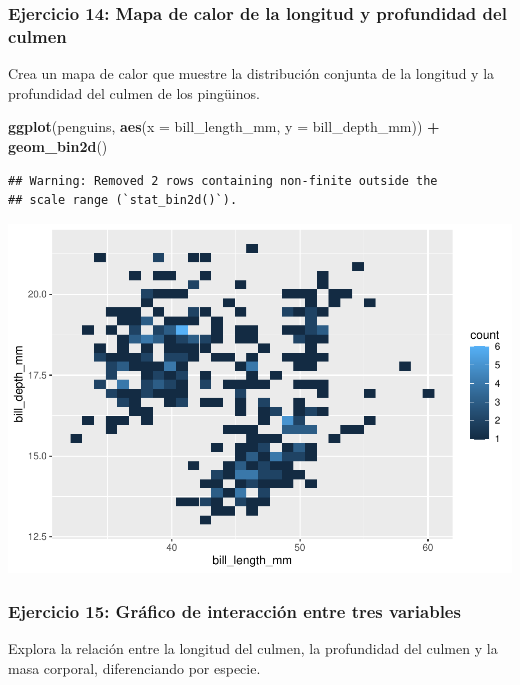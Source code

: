 \documentclass[
]{book}
\newenvironment{Shaded}{\begin{snugshade}}{\end{snugshade}}
\newcommand{\AttributeTok}[1]{\textcolor[rgb]{0.13,0.29,0.53}{#1}}
\newcommand{\FunctionTok}[1]{\textcolor[rgb]{0.13,0.29,0.53}{\textbf{#1}}}
\newcommand{\NormalTok}[1]{#1}
\newcommand{\SpecialCharTok}[1]{\textcolor[rgb]{0.81,0.36,0.00}{\textbf{#1}}}
\begin{document}
\subsubsection{Ejercicio 14: Mapa de calor de la longitud y profundidad del culmen}\label{ejercicio-14-mapa-de-calor-de-la-longitud-y-profundidad-del-culmen}

Crea un mapa de calor que muestre la distribución conjunta de la longitud y la profundidad del culmen de los pingüinos.

\begin{Shaded}
\begin{Highlighting}[]
\FunctionTok{ggplot}\NormalTok{(penguins, }\FunctionTok{aes}\NormalTok{(}\AttributeTok{x =}\NormalTok{ bill\_length\_mm, }\AttributeTok{y =}\NormalTok{ bill\_depth\_mm)) }\SpecialCharTok{+}
  \FunctionTok{geom\_bin2d}\NormalTok{()}
\end{Highlighting}
\end{Shaded}

\begin{verbatim}
## Warning: Removed 2 rows containing non-finite outside the
## scale range (`stat_bin2d()`).
\end{verbatim}

\includegraphics{bookdown-demo_files/figure-latex/unnamed-chunk-196-1.pdf}

\subsubsection{Ejercicio 15: Gráfico de interacción entre tres variables}\label{ejercicio-15-gruxe1fico-de-interacciuxf3n-entre-tres-variables}

Explora la relación entre la longitud del culmen, la profundidad del culmen y la masa corporal, diferenciando por especie.
\end{document}
